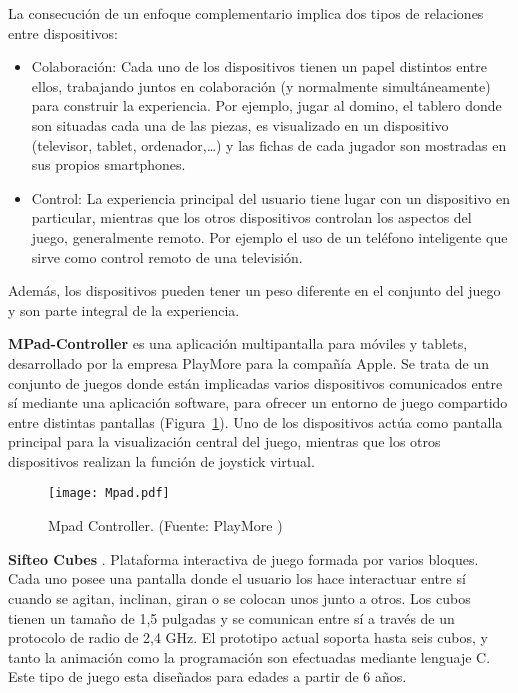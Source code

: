 La consecución de un enfoque complementario implica dos tipos de relaciones entre dispositivos:
\begin{itemize}
\item Colaboración: Cada uno de los dispositivos tienen un papel distintos entre ellos, trabajando juntos en colaboración (y normalmente simultáneamente) para construir la experiencia. Por ejemplo, jugar al domino, el tablero donde son situadas cada una de las piezas, es visualizado en un dispositivo (televisor, tablet, ordenador,…) y las fichas de cada jugador son mostradas en sus propios smartphones.

\item Control: La experiencia principal del usuario tiene lugar con un dispositivo en particular, mientras que los otros dispositivos controlan los aspectos del juego, generalmente remoto. Por ejemplo el uso de un teléfono inteligente que sirve como control remoto de una televisión.
\end{itemize}
Además, los dispositivos pueden tener un peso diferente en el conjunto del juego y son parte integral de la experiencia. 


\textbf{MPad-Controller} es una aplicación multipantalla para móviles y tablets, desarrollado por la empresa PlayMore para la compañía Apple. Se trata de un conjunto de juegos donde están implicadas varios dispositivos comunicados entre sí mediante una aplicación software, para ofrecer un entorno de juego compartido entre distintas pantallas (Figura~\ref{fig:Mpad}). Uno de los dispositivos actúa como pantalla principal para la visualización central del juego, mientras que los otros dispositivos realizan la función de joystick virtual.

\begin{figure}[!h]
\begin{center}
\texttt{[image: Mpad.pdf]}
\caption{Mpad Controller. (Fuente: PlayMore \cite{Mpad})}
\label{fig:Mpad}
\end{center}
\end{figure}


\textbf{Sifteo Cubes} \cite{Merrill}. Plataforma interactiva de juego formada por varios bloques. Cada uno posee una pantalla donde el usuario los hace interactuar entre sí cuando se agitan, inclinan, giran o se colocan unos junto a otros. Los cubos tienen un tamaño de 1,5 pulgadas y se comunican entre sí a través de un protocolo de radio de 2,4 GHz. El prototipo actual soporta hasta seis cubos, y tanto la animación como la programación son efectuadas mediante lenguaje C.
Este tipo de juego esta diseñados para edades a partir de 6 años.

